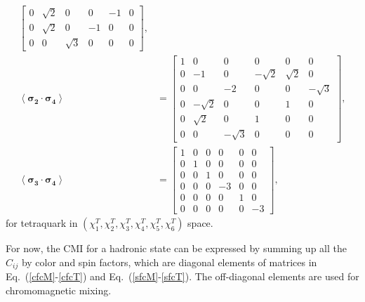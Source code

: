 \documentclass[prd,twocolumn,floatfix,nofootinbib]{revtex4}
\begin{document}
\begin{align}
\begin{bmatrix}
            0 & \sqrt{2} & 0 & 0 & -1 & 0 \\
            0 & \sqrt{2} & 0 & -1 & 0 & 0 \\
            0 & 0 & \sqrt{3} & 0 & 0 & 0
        \end{bmatrix}, \\
        \left\langle \boldsymbol{\sigma_{2}}\cdot \boldsymbol{\sigma_{4}} \right\rangle&=
        \begin{bmatrix}
            1 & 0 & 0 & 0 & 0 & 0 \\
            0 & -1 & 0 & -\sqrt{2} & \sqrt{2} & 0 \\
            0 & 0 & -2 & 0 & 0 & -\sqrt{3} \\
            0 & -\sqrt{2} & 0 & 0 & 1 & 0 \\
            0 & \sqrt{2} & 0 & 1 & 0 & 0 \\
            0 & 0 & -\sqrt{3} & 0 & 0 & 0
        \end{bmatrix}, \\
        \left\langle \boldsymbol{\sigma_{3}}\cdot \boldsymbol{\sigma_{4}} \right\rangle&=
        \begin{bmatrix}
            1 & 0 & 0 & 0 & 0 & 0 \\
            0 & 1 & 0 & 0 & 0 & 0 \\
            0 & 0 & 1 & 0 & 0 & 0 \\
            0 & 0 & 0 & -3 & 0 & 0 \\
            0 & 0 & 0 & 0 & 1 & 0 \\
            0 & 0 & 0 & 0 & 0 & -3
        \end{bmatrix}, \label{sfcT}
    \end{align}
for tetraquark in $(\chi_{1}^{T},\chi_{2}^{T},\chi_{3}^{T},\chi_{4}^{T},\chi_{5}^{T},\chi_{6}^{T})$ space.

For now, the CMI for a hadronic state can be expressed by summing up all the $C_{ij}$ by color and spin factors,
which are diagonal elements of matrices in Eq.~(\ref{cfcM}-\ref{cfcT}) and Eq.~(\ref{sfcM}-\ref{sfcT}).
The off-diagonal elements are used for chromomagnetic mixing.


\medskip
\end{document}
